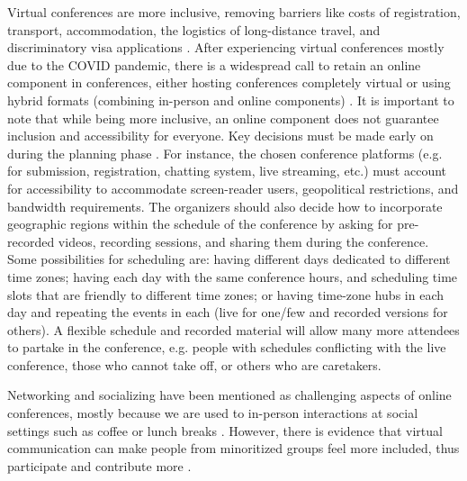 \documentclass[10pt,letterpaper]{article}
\begin{document}
Virtual conferences are more inclusive, removing barriers like costs of registration, transport, accommodation, the logistics of long-distance travel, and discriminatory visa applications \cite{jooKeepOnlineOption2021, ninerBetterWhomLeveling2021, salibaGettingGripsOnline2020, gichoraTenSimpleRules2010a}. 
After experiencing virtual conferences mostly due to the COVID pandemic, there is a widespread call to retain an online component in conferences, either hosting conferences completely virtual or using hybrid formats (combining in-person and online components) \cite{jooKeepOnlineOption2021, woolstonLearningLoveVirtual2020, ninerBetterWhomLeveling2021, roosOnlineConferencesNew2020, levitisCenteringInclusivityDesign2021, sarabipourChangingScientificMeetings2021}.
It is important to note that while being more inclusive, an online component does not guarantee inclusion and accessibility for everyone.
Key decisions must be made early on during the planning phase \cite{levitisCenteringInclusivityDesign2021}. For instance, the chosen conference platforms (e.g. for submission, registration, chatting system, live streaming, etc.) must account for accessibility to accommodate screen-reader users, geopolitical restrictions, and bandwidth requirements. 
 The organizers should also decide how to incorporate geographic regions within the schedule of the conference by asking for pre-recorded videos, recording sessions, and sharing them during the conference. Some possibilities for scheduling are: having different days dedicated to different time zones; having each day with the same conference hours, and scheduling time slots that are friendly to different time zones; or having time-zone hubs in each day and repeating the events in each (live for one/few and recorded versions for others). 
A flexible schedule and recorded material will allow many more attendees to partake in the conference, e.g. people with schedules conflicting with the live conference, those who cannot take off, or others who are caretakers. 

Networking and socializing have been mentioned as challenging aspects of online conferences, mostly because we are used to in-person interactions at social settings such as coffee or lunch breaks \cite{salibaGettingGripsOnline2020, roosOnlineConferencesNew2020}. 
However, there is evidence that virtual communication can make people from minoritized groups feel more included, thus participate and contribute more \cite{trianaDoesOrderFacetoFace2012,blackEngenderingBelongingThoughtful2020}.
\end{document}
